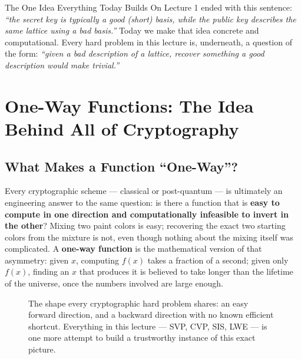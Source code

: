 \begin{rmkbox}{The One Idea Everything Today Builds On}
Lecture 1 ended with this sentence: \emph{``the secret key is typically a good (short) basis, while the public key describes the same lattice using a bad basis.''} Today we make that idea concrete and computational. Every hard problem in this lecture is, underneath, a question of the form: \emph{``given a bad description of a lattice, recover something a good description would make trivial.''}
\end{rmkbox}

\section{One-Way Functions: The Idea Behind All of Cryptography}
\label{sec:L2:one-way-functions-the-idea-behind-all-of}

\subsection{What Makes a Function ``One-Way''?}
\label{sec:L2:what-makes-a-function-one-way}

Every cryptographic scheme --- classical or post-quantum --- is ultimately an engineering answer to the same question: is there a function that is \textbf{easy to compute in one direction and computationally infeasible to invert in the other}? Mixing two paint colors is easy; recovering the exact two starting colors from the mixture is not, even though nothing about the mixing itself was complicated. A \textbf{one-way function} is the mathematical version of that asymmetry: given $x$, computing $f(x)$ takes a fraction of a second; given only $f(x)$, finding an $x$ that produces it is believed to take longer than the lifetime of the universe, once the numbers involved are large enough.

\begin{figure}[h]
\centering
{}
\caption{The shape every cryptographic hard problem shares: an easy forward direction, and a backward direction with no known efficient shortcut. Everything in this lecture --- SVP, CVP, SIS, LWE --- is one more attempt to build a trustworthy instance of this exact picture.}
\label{fig:owf-schematic}
\end{figure}


